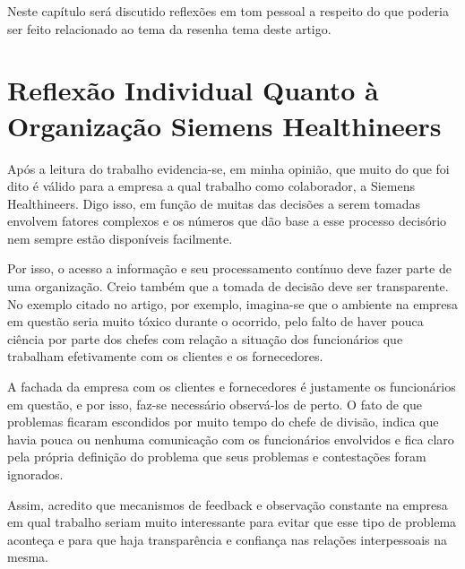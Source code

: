 Neste capítulo será discutido reflexões em tom pessoal a respeito do que 
poderia ser feito relacionado ao tema da resenha tema deste artigo.

\section{Reflexão Individual Quanto à Organização Siemens Healthineers}

Após a leitura do trabalho evidencia-se, em minha opinião, que muito
do que foi dito é válido para a empresa a qual trabalho como colaborador,
a Siemens Healthineers. Digo isso, em função de muitas das decisões
a serem tomadas envolvem fatores complexos e os números que dão base
a esse processo decisório nem sempre estão disponíveis facilmente.

Por isso, o acesso a informação e seu processamento contínuo deve
fazer parte de uma organização. Creio também que a tomada de decisão
deve ser transparente. No exemplo citado no artigo, por exemplo, imagina-se
que o ambiente na empresa em questão seria muito tóxico durante o
ocorrido, pelo falto de haver pouca ciência por parte dos chefes com
relação a situação dos funcionários que trabalham efetivamente com
os clientes e os fornecedores. 

A fachada da empresa com os clientes e fornecedores é justamente os
funcionários em questão, e por isso, faz-se necessário observá-los
de perto. O fato de que problemas ficaram escondidos por muito tempo
do chefe de divisão, indica que havia pouca ou nenhuma comunicação
com os funcionários envolvidos e fica claro pela própria definição
do problema que seus problemas e contestações foram ignorados. 

Assim, acredito que mecanismos de feedback e observação constante
na empresa em qual trabalho seriam muito interessante para evitar
que esse tipo de problema aconteça e para que haja transparência e
confiança nas relações interpessoais na mesma.
